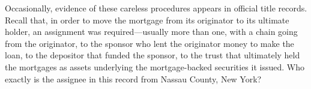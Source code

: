\item Occasionally, evidence of these careless procedures appears in official
title records. Recall that, in order to move the mortgage from its originator
to its ultimate holder, an assignment was required---usually more than one,
with a chain going from the originator, to the sponsor who lent the originator
money to make the loan, to the depositor that funded the sponsor, to the trust
that ultimately held the mortgages as assets underlying the mortgage-backed
securities it issued. Who exactly is the assignee in this record from Nassau
County, New York?

